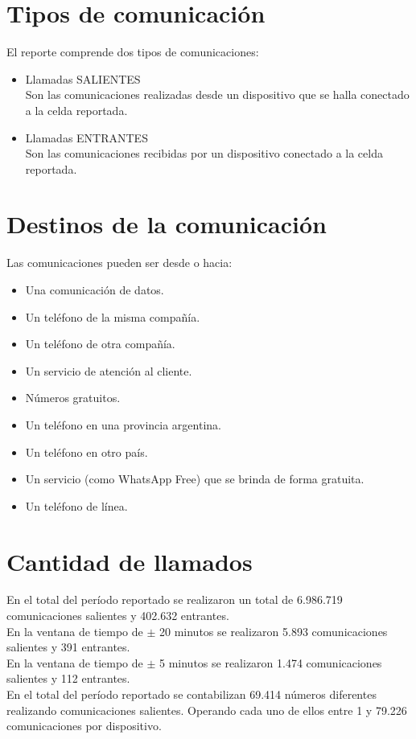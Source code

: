 \documentclass[12pt]{report}
\begin{document}
	\section*{Tipos de comunicación}
	El reporte comprende dos tipos de comunicaciones:
	\begin{itemize}
		\item Llamadas SALIENTES\\
		Son las comunicaciones realizadas desde un dispositivo que se halla conectado a la celda reportada.
		\item Llamadas ENTRANTES\\
		
		Son las comunicaciones recibidas por un dispositivo conectado a la celda reportada.
	\end{itemize}
	\section*{Destinos de la comunicación}
	Las comunicaciones pueden ser desde o hacia:
	\begin{itemize}
		\item Una comunicación de datos. 
		\item Un teléfono de la misma compañía. 
		\item Un teléfono de otra compañía.
		\item Un servicio de atención al cliente.
		\item Números gratuitos.
		\item Un teléfono en una provincia argentina.
		\item Un teléfono en otro país.
		\item Un servicio (como WhatsApp Free) que se brinda de forma gratuita.
		\item Un teléfono de línea.
	\end{itemize}
	\section*{Cantidad de llamados}
	En el total del período reportado se realizaron un total de 6.986.719 comunicaciones salientes y 402.632 entrantes.\\
	En la ventana de tiempo de $\pm$ 20 minutos se realizaron 5.893 comunicaciones salientes y 391 entrantes.\\
	En la ventana de tiempo de $\pm$ 5 minutos se realizaron 1.474 comunicaciones salientes y 112 entrantes.\\
	
	En el total del período reportado se contabilizan 69.414 números diferentes realizando comunicaciones salientes. Operando cada uno de ellos entre 1 y 79.226 comunicaciones por dispositivo.\\
	
\end{document}
